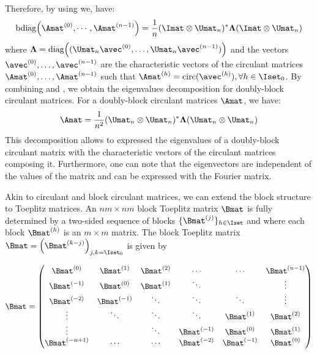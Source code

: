 Therefore, by using  we, have:
\begin{equation} \label{equation:ch2-diagonalization_circulant_with_bdiag}
  \bdiag\leftmat \Amat^{(0)}, \cdots, \Amat^{(n-1)} \rightmat = \frac{1}{n} (\Imat \otimes \Umat_n)^* \boldsymbol{\Lambda} (\Imat \otimes \Umat_n)
\end{equation}
where $\boldsymbol{\Lambda} = \diag\left((\Umat_n \avec^{(0)}, \dots, \Umat_n \avec^{(n-1)})\right)$ and the vectors $\avec^{(0)}, \dots, \avec^{(n-1)}$ are the characteristic vectors of the circulant matrices $\Amat^{(0)}, \dots, \Amat^{(n-1)}$ such that $\Amat^{(h)} = \circulant(\avec^{(h)}), \forall h \in \Iset_0$.
By combining  and , we obtain the eigenvalues decomposition for doubly-block circulant matrices.
For a doubly-block circulant matrices $\Amat$, we have:
\begin{equation} \label{equation:ch2-diagonalization_doubly_block_circulant_matrix}
  \Amat = \frac{1}{n^2} (\Umat_n \otimes \Umat_n)^* \boldsymbol{\Lambda} (\Umat_n \otimes \Umat_n) 
\end{equation}
This decomposition allows to expressed the eigenvalues of a doubly-block circulant matrix with the characteristic vectors of the circulant matrices composing it.
Furthermore, one can note that the eigenvectors are independent of the values of the matrix and can be expressed with the Fourier matrix.


Akin to circulant and block circulant matrices, we can extend the block structure to Toeplitz matrices.
An $nm \times nm$ block Toeplitz matrix $\Bmat$ is fully determined by a two-sided sequence of blocks $\{\Bmat^{(j)}\}_{h \in \Iset}$ and where each block $\Bmat^{(h)}$ is an $m \times m$ matrix.
The block Toeplitz matrix $\Bmat = \leftmat\Bmat^{(k-j)} \rightmat_{j,k = \Iset_0}$ is given by

\begin{equation} \label{equation:ch2-block_toeplitz_matrices}
  \Bmat = 
  \leftmatrix
    \Bmat^{(0)}    & \Bmat^{(1)}  & \Bmat^{(2)} & \cdots       & \cdots       & \Bmat^{(n-1)} \\
    \Bmat^{(-1)}   & \Bmat^{(0)}  & \Bmat^{(1)} & \ddots       &              & \vdots        \\
    \Bmat^{(-2)}   & \Bmat^{(-1)} & \ddots      & \ddots       & \ddots       & \vdots        \\ 
    \vdots         & \ddots       & \ddots      & \ddots       & \Bmat^{(1)}  & \Bmat^{(2)}   \\
    \vdots         &              & \ddots      & \Bmat^{(-1)} & \Bmat^{(0)}  & \Bmat^{(1)}   \\
    \Bmat^{(-n+1)} & \cdots       & \cdots      & \Bmat^{(-2)} & \Bmat^{(-1)} & \Bmat^{(0)}
  \rightmatrix
\end{equation}

